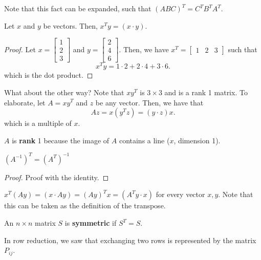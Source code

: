 Note that this fact can be expanded, such that \( (ABC)^{T}=C^{T}B^{T}A^{T}     \).

\begin{prop}
	Let \( x \) and \( y \) be vectors. Then, \( x^{T}y = (x \cdot y)  \).
\end{prop}
\begin{proof}
	Let \( x = \begin{bmatrix}
		1 \\ 2 \\ 3
	\end{bmatrix} \) and \( y = \begin{bmatrix}
		2 \\ 4 \\ 6
	\end{bmatrix} \). Then, we have \(
		x^{T} = \begin{bmatrix}
			1 & 2 & 3
		\end{bmatrix} 
	\) such that \[
		x^{T}y = 1 \cdot 2 + 2 \cdot 4 + 3 \cdot  6 
	.\] which is the dot product.
\end{proof}

What about the other way? Note that \( x y^{T}  \) is \( 3\times 3 \) and is a rank 1 matrix. To elaborate, let \(
	A = xy^{T} 
\)  and \( z \) be any vector. Then, we have that \[
	Az = x(y^{T}z )= (y \cdot z) x
.\] which is a multiple of \( x \).

\begin{definition}
	\( A \) is \textbf{rank} 1 because the image of \( A \) contains a line (\( x \), dimension 1).
\end{definition}

\begin{prop}
	\( (A^{-1} )^{T} = (A^{T} )^{-1}   \)
\end{prop}
\begin{proof}
	Proof with the identity.
\end{proof}

\begin{prop}
	\( x^{T}(Ay) = (x \cdot Ay) = (Ay)^{T}x = (A^{T}y\cdot x )  \) for every vector \( x,y \). Note that this can be taken as the definition of the transpose.
\end{prop}

\begin{definition}
	An \( n\times n \) matrix \( S \) is \textbf{symmetric} if \( S^{T}=S  \).
\end{definition}

In row reduction, we saw that exchanging two rows is represented by the matrix \( P_{ij} \).

